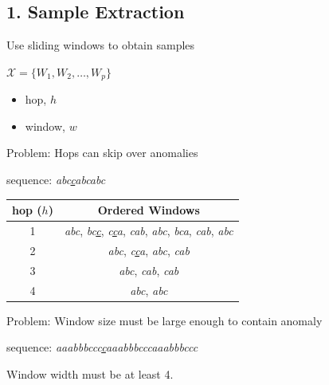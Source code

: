 \documentclass{beamer}
\begin{document}
  \subsection{1. Sample Extraction}
  
  \begin{frame}{Use sliding windows to obtain samples}
    
    \begin{center}
    $\mathcal{X}=\{W_1,W_2,\ldots,W_p\}$
    \end{center}

    \begin{itemize}
      \item hop, $h$
      \item window, $w$ %
    \end{itemize}

  \end{frame}


  \begin{frame}{Problem: Hops can skip over anomalies}

    \begin{center} 
     sequence: \emph{abc\underline{c}abcabc} 

      \begin{tabular}{|c|c|}
        \hline
        hop ($h$) & Ordered Windows \\
        \hline
        \hline
        1 & \emph{abc},
            \emph{bc\underline{c}}, 
            \emph{c\underline{c}a}, 
            \emph{cab},
            \emph{abc}, 
            \emph{bca},
            \emph{cab},
            \emph{abc} \\
        \hline
        2 & \emph{abc},
            \emph{c\underline{c}a},
            \emph{abc},
            \emph{cab} \\
        \hline
        3 & \emph{abc}, 
            \emph{cab},
            \emph{cab} \\
        \hline
        4 & \emph{abc}, 
            \emph{abc} \\
        \hline
      \end{tabular}

    \end{center}
    
  \end{frame}


  \begin{frame}{Problem: Window size must be large enough to contain anomaly}

    \begin{center}
      sequence:
      \emph{aaabbbccc\underline{c}aaabbbcccaaabbbccc}
    \end{center}

    Window width must be at least 4.

  \end{frame}
\end{document}
